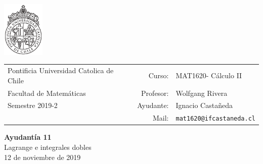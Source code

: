 \documentclass[12pt]{article}
\makeatletter
\newcommand{\ayudantia}{{\sc Ayudantía 11}}
\newcommand{\tituloayu}{Lagrange e integrales dobles}
\newcommand{\fecha}{12 de noviembre de 2019}
\newcommand{\sigla}{MAT1620}
\newcommand{\nombre}{Cálculo II}
\newcommand{\profesor}{Wolfgang Rivera}
\newcommand{\ano}{2019}
\newcommand{\semestre}{2}
\newcommand{\mail}{mat1620@ifcastaneda.cl}
\makeatother
\begin{document}
\thispagestyle{empty}

\begin{minipage}{2cm}
	\includegraphics[width=2cm]{../../../../img/logo.pdf}
	\vspace{0.5cm}
\end{minipage}
\begin{minipage}{\linewidth}
	\begin{tabular}{lrl}
		{\scriptsize\sc Pontificia Universidad Catolica de Chile} & \hspace*{0.7in}Curso: &
		\sigla  - \nombre\\
		{\sc Facultad de Matemáticas}&
		Profesor: & \profesor \\
		{\sc Semestre \ano-\semestre} & Ayudante: & {Ignacio Castañeda}\\
		& {Mail:} & \texttt{\mail}
	\end{tabular}
\end{minipage}

\vspace{-10mm}
\begin{center}
	{\LARGE\bf \ayudantia}\\
	\vspace{0.1cm}
	{\tituloayu}\\
	\vspace{0.1cm}
	\fecha\\
	\vspace{0.4cm}
\end{center}
\end{document}
